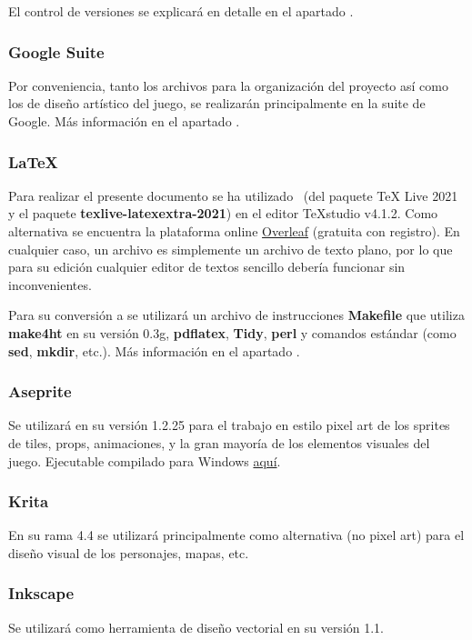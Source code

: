 El control de versiones se explicará en detalle en el apartado .

\subsubsection{Google Suite}
Por conveniencia, tanto los archivos para la organización del proyecto así como
los de diseño artístico del juego, se realizarán principalmente en la suite de
Google. Más información en el apartado .

\subsubsection{LaTeX}
Para realizar el presente documento se ha utilizado \LaTeXe\ (del paquete TeX
Live 2021 y el paquete \textbf{texlive-latexextra-2021}) en el editor TeXstudio v4.1.2.
Como alternativa se encuentra la plataforma online
\href{https://www.overleaf.com/}{Overleaf} (gratuita con registro). En
cualquier caso, un archivo  es simplemente un archivo de texto plano,
por lo que para su edición cualquier editor de textos sencillo debería
funcionar sin inconvenientes.

Para su conversión a  se utilizará un archivo de instrucciones
\textbf{Makefile} que utiliza \textbf{make4ht} en su versión 0.3g,
\textbf{pdflatex}, \textbf{Tidy}, \textbf{perl} y comandos  estándar
(como \textbf{sed}, \textbf{mkdir}, etc.). Más información en el apartado
.

\subsubsection{Aseprite}
Se utilizará en su versión 1.2.25 para el trabajo en estilo pixel art de los sprites de tiles, props, animaciones,  y la gran mayoría de los elementos visuales del juego. Ejecutable compilado para Windows \href{https://drive.google.com/drive/folders/1DPhGeg7WzV9j81u3B5isgsXqoMtfd_Uv?usp=sharing}{aquí}.

\subsubsection{Krita}
En su rama 4.4 se utilizará principalmente como alternativa (no pixel art) para el diseño visual de los personajes, mapas, etc.

\subsubsection{Inkscape}
Se utilizará como herramienta de diseño vectorial en su versión 1.1.

